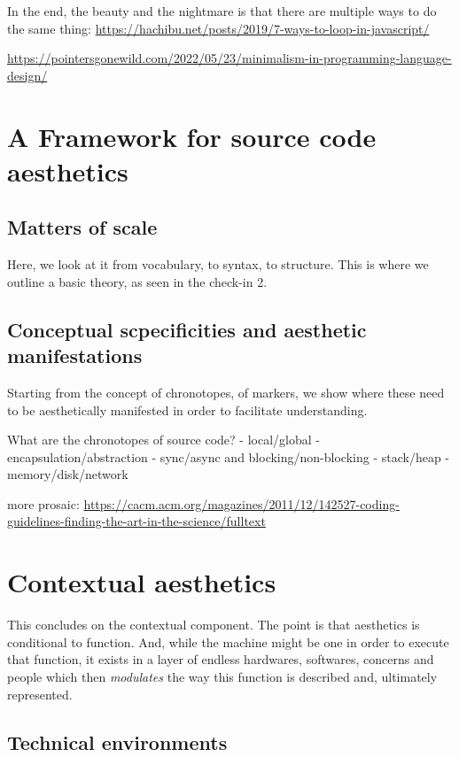 In the end, the beauty and the nightmare is that there are multiple ways to do the same thing: \url{https://hachibu.net/posts/2019/7-ways-to-loop-in-javascript/}

\url{https://pointersgonewild.com/2022/05/23/minimalism-in-programming-language-design/}

\section{A Framework for source code aesthetics}
\label{sec:programming-aesthetic-framework}

\subsection{Matters of scale}
\label{subsec:matters-of-scale}

Here, we look at it from vocabulary, to syntax, to structure. This is where we outline a basic theory, as seen in the check-in 2.

\subsection{Conceptual scpecificities and aesthetic manifestations}
\label{subsec:conceptual-specificities}

Starting from the concept of chronotopes, of markers, we show where these need to be aesthetically manifested in order to facilitate understanding.

What are the chronotopes of source code?
- local/global
- encapsulation/abstraction
- sync/async and blocking/non-blocking
- stack/heap
- memory/disk/network

more prosaic: \url{https://cacm.acm.org/magazines/2011/12/142527-coding-guidelines-finding-the-art-in-the-science/fulltext}

\section{Contextual aesthetics}
\label{sec:contextual-aesthetics}

This concludes on the contextual component. The point is that aesthetics is conditional to function. And, while the machine might be one in order to execute that function, it exists in a layer of endless hardwares, softwares, concerns and people which then \emph{modulates} the way this function is described and, ultimately represented.

\subsection{Technical environments}
\label{subsec:technical-environments}

